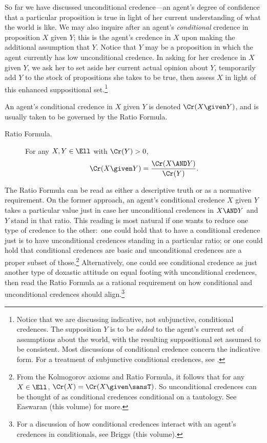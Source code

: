 So far we have discussed unconditional credence---an agent's degree of confidence that a particular proposition is true in light of her current understanding of what the world is like. We may also inquire after an agent's \emph{conditional} credence in proposition $X$ given $Y$; this is the agent's credence in $X$ upon making the additional assumption that $Y$. Notice that $Y$ may be a proposition in which the agent currently has low unconditional credence. In asking for her credence in $X$ given $Y$, we ask her to set aside her current actual opinion about $Y$, temporarily add $Y$ to the stock of propositions she takes to be true, then assess $X$ in light of this enhanced suppositional set.\footnote
{Notice that we are discussing indicative, not subjunctive, conditional credences. The supposition $Y$ is to be \emph{added} to the agent's current set of assumptions about the world, with the resulting suppositional set assumed to be consistent. Most discussions of conditional credence concern the indicative form. For a treatment of subjunctive conditional credences, see \citet{JoyceCausal}.}
 
An agent's conditional credence in $X$ given $Y$ is denoted $\Cr(X \given Y)$, and is usually taken to be governed by the Ratio Formula.
\begin{description}
\item[Ratio Formula.\,] {For any $X, Y \in \Ell$ with $\Cr(Y)>0$,
$$\Cr(X \given Y)=\frac{\Cr(X \AND Y)}{\Cr(Y)}.$$}
\end{description}
The Ratio Formula can be read as either a descriptive truth or as a normative requirement. On the former approach, an agent's conditional credence $X$ given $Y$ takes a particular value just in case her unconditional credences in $X \AND Y$ and $Y$ stand in that ratio. This reading is most natural if one wants to reduce one type of credence to the other:\ one could hold that to have a conditional credence just is to have unconditional credences standing in a particular ratio; or one could hold that conditional credences are basic and unconditional credences are a proper subset of those.\footnote
{\label{n:condbas}From the Kolmogorov axioms and Ratio Formula, it follows that for any $X \in \Ell$, $\Cr(X)=\Cr(X \given \sansT)$. So unconditional credences can be thought of as conditional credences conditional on a tautology. See Easwaran (this volume) for more.}
 Alternatively, one could see conditional credence as just another type of doxastic attitude on equal footing with unconditional credences, then read the Ratio Formula as a rational requirement on how conditional and unconditional credences should align.\footnote
{For a discussion of how conditional credences interact with an agent's credences in conditionals, see Briggs (this volume).}


